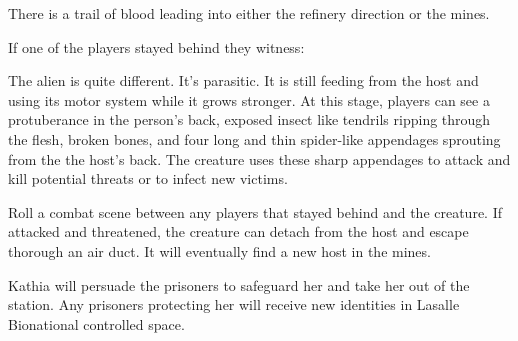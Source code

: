 There is a trail of blood leading into either the refinery direction or the mines. 

If one of the players stayed behind they witness:


The alien is quite different. It's parasitic. It is still feeding from the host and using its motor system while it grows stronger. At this stage, players can see a protuberance in the person's back, exposed insect like tendrils ripping through the flesh, broken bones, and four long and thin spider-like appendages sprouting from the the host's back. The creature uses these sharp appendages to attack and kill potential threats or to infect new victims. 


Roll a combat scene between any players that stayed behind and the creature. If attacked and threatened, the creature can detach from the host and escape thorough an air duct. It will eventually find a new host in the mines.

Kathia will persuade the prisoners to safeguard her and take her out of the station. Any prisoners protecting her will receive new identities in Lasalle Bionational controlled space.



    